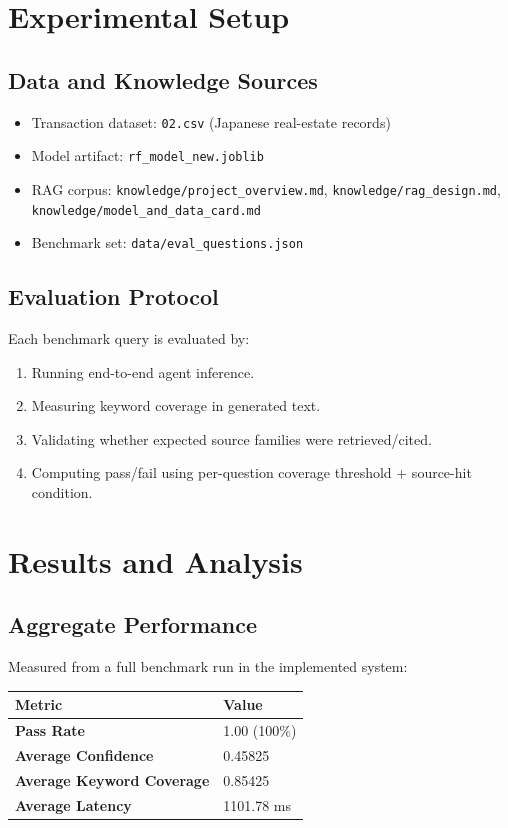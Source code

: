 \documentclass[12pt,a4paper]{article}
\begin{document}
\section{Experimental Setup}
\subsection{Data and Knowledge Sources}
\begin{itemize}[leftmargin=1.6em]
  \item Transaction dataset: \texttt{02.csv} (Japanese real-estate records)
  \item Model artifact: \texttt{rf\_model\_new.joblib}
  \item RAG corpus: \texttt{knowledge/project\_overview.md}, \texttt{knowledge/rag\_design.md}, \texttt{knowledge/model\_and\_data\_card.md}
  \item Benchmark set: \texttt{data/eval\_questions.json}
\end{itemize}

\subsection{Evaluation Protocol}
Each benchmark query is evaluated by:
\begin{enumerate}[leftmargin=1.8em]
  \item Running end-to-end agent inference.
  \item Measuring keyword coverage in generated text.
  \item Validating whether expected source families were retrieved/cited.
  \item Computing pass/fail using per-question coverage threshold + source-hit condition.
\end{enumerate}

\section{Results and Analysis}
\subsection{Aggregate Performance}
Measured from a full benchmark run in the implemented system:

\begin{tabularx}{\linewidth}{@{}>{\bfseries}lX@{}}
\toprule
Metric & Value \\
\midrule
Pass Rate & 1.00 (100\%) \\
Average Confidence & 0.45825 \\
Average Keyword Coverage & 0.85425 \\
Average Latency & 1101.78 ms \\
\bottomrule
\end{tabularx}
\end{document}
